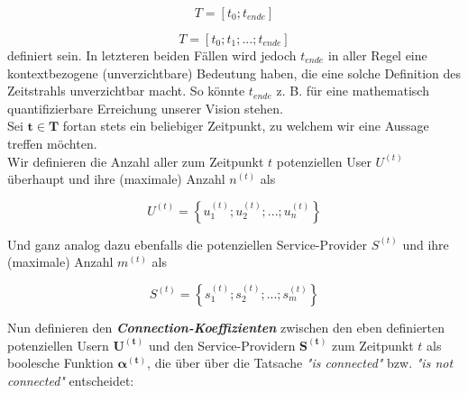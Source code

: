 \documentclass[11pt]{scrartcl}
\begin{document}
\begin{equation*}
  T = [t_0; t_{ende}]
\end{equation*}

\begin{equation*}
  T = [t_0; t_1;...; t_{ende}]
\end{equation*}
definiert sein. In letzteren beiden Fällen wird jedoch $t_{ende}$ in aller Regel eine kontextbezogene (unverzichtbare) Bedeutung haben, die eine solche Definition des Zeitstrahls unverzichtbar macht. So könnte $t_{ende}$ z. B. für eine mathematisch quantifizierbare Erreichung unserer Vision stehen. \\

Sei $\mathbf{t \in T}$ fortan stets ein beliebiger Zeitpunkt, zu welchem wir eine Aussage treffen möchten. \\


Wir definieren die Anzahl aller zum Zeitpunkt $t$ potenziellen User $U^{(t)}$ überhaupt und ihre (maximale) Anzahl $n^{(t)}$ als \\

\begin{Def}\label{defU}
\begin{equation*}
  U^{(t)} = \left\{ u^{(t)}_1; u^{(t)}_2;...; u^{(t)}_{n} \right\}
\end{equation*}
\end{Def} 

\vspace{0.3cm}


Und ganz analog dazu ebenfalls die potenziellen Service-Provider $S^{(t)}$ und ihre (maximale) Anzahl $m^{(t)}$ als \\

\begin{Def}\label{defS}
\begin{equation*}
  S^{(t)} = \left\{ s^{(t)}_1; s^{(t)}_2;...; s^{(t)}_{m}\right\}
\end{equation*}
\end{Def}

\vspace{1cm}


Nun definieren den \textbf{\textit{Connection-Koeffizienten}} zwischen den eben definierten potenziellen Usern $\mathbf{U^{(t)}}$ und den Service-Providern $\mathbf{S^{(t)}}$ zum Zeitpunkt $t$ als boolesche Funktion $\mathbf{\alpha^{(t)}}$, die über über die Tatsache \textit{"is connected"} bzw. \textit{"is not connected"} entscheidet: \\
\end{document}
